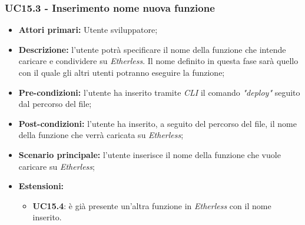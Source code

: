 \subsubsection{UC15.3 - Inserimento nome nuova funzione}
\begin{itemize}
	\item \textbf{Attori primari:} Utente sviluppatore;
	\item \textbf{Descrizione:} l'utente potrà specificare il nome della funzione che intende caricare e condividere su \textit{Etherless}. Il nome definito in questa fase sarà quello con il quale gli altri utenti potranno eseguire la funzione; 
	\item \textbf{Pre-condizioni:} l'utente ha inserito tramite \textit{CLI\glo} il comando \textit{"deploy\glos"} seguito dal percorso del file;
	\item \textbf{Post-condizioni:} l'utente ha inserito, a seguito del percorso del file, il nome della funzione che verrà caricata su \textit{Etherless};
	\item \textbf{Scenario principale:} l'utente inserisce il nome della funzione che vuole caricare su \textit{Etherless};
	\item \textbf{Estensioni:} 
	\begin{itemize}
		\item \textbf{UC15.4}: è già presente un'altra funzione in \textit{Etherless} con il nome inserito.
	\end{itemize}
\end{itemize}